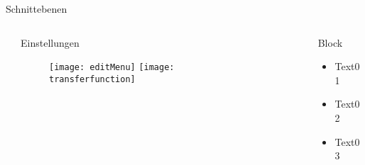 \begin{frame}[t]
\begin{columns}[t]
\begin{column}{.465\textwidth}
\begin{block}{Schnittebenen}
     
   
   
\end{block}


\end{column} %



\begin{column}{.025\textwidth}\end{column} %

\end{columns} %


\begin{columns}[t] %

\begin{column}{.025\textwidth}\end{column} %

\begin{column}{.465\textwidth} %


\begin{block}{Einstellungen}

    \begin{figure}
    	\center
        \texttt{[image: editMenu]}
        \texttt{[image: transferfunction]}
    \end{figure}


\end{block}


\end{column} %



\begin{column}{.025\textwidth}\end{column} %

\begin{column}{.465\textwidth}

\begin{block}{Block}
  
   \begin{itemize}
   \item Text01
   \item Text02
   \item Text03
   \end{itemize}
   

\end{block}
\end{column}
\end{columns}
\end{frame}
